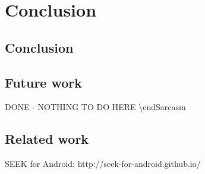 \chapter{Conclusion}
\label{ch:conclusion}
\section{Conclusion}

\section{Future work}
\label{sec:future}
DONE - NOTHING TO DO HERE \hspace{1cm} \textbackslash endSarcasm

\section{Related work}
SEEK for Android: http://seek-for-android.github.io/
